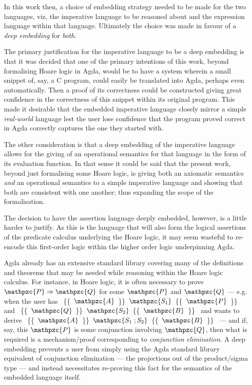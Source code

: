 \documentclass[oneside,12pt]{article}
\newcommand{\textM}[1]{\ensuremath{\mathpzc{#1}}}
\newcommand{\gtcil}[3]{ \!\!\!\!   \{\!\!\{  \!\!\!  \textM{#1} \!\!\! \}\!\!\} \textM{#2}   \{\!\!\{  \!\!\! \textM{#3} \!\!\!  \}\!\!\} \!\!\!  }
\begin{document}
In this work then, a choice of embedding strategy needed to be made for the two languages, viz, the imperative language to be reasoned about and the expression language within that language. Ultimately the choice was made in favour of a \emph{deep embedding} for \emph{both}.

The primary justification for the imperative language to be a deep embedding is that it was decided that one of the primary intentions of this work, beyond formalising Hoare logic in Agda, would be to have a system wherein a small snippet of, say, a C program, could easily be translated into Agda, perhaps even automatically. Then a proof of its correctness could be constructed giving great confidence in the correctness of this snippet within its original program. This made it desirable that the embedded imperative language closely mirror a simple \emph{real-world} language lest the user lose confidence that the program proved correct in Agda correctly captures the one they started with.

The other consideration is that a deep embedding of the imperative language allows for the giving of an operational semantics for that language in the form of its evaluation function. In that sense it could be said that the present work, beyond just formalising some Hoare logic, is giving both an axiomatic semantics \emph{and} an operational semantics to a simple imperative language and showing that both are consistent with one another; thus expanding the scope of the formalisation.


The decision to have the assertion language deeply embedded, however, is a little harder to justify. As this is the language that will also form the logical assertions of the predicate calculus underlying the Hoare logic, it may seem wasteful to re-encode this first-order logic within the higher order logic underpinning Agda.

Agda already has an extensive standard library covering many of the definitions and theorems that may be needed while reasoning within the Hoare logic calculus. For instance, in Hoare logic, it is often necessary to prove $\textM{P} \Rightarrow \textM{Q}$ for some \textM{P} and \textM{Q} --- e.g.\! when the user has \mbox{\gtcil{A}{S_1}{P}} and \mbox{\gtcil{Q}{S_2}{B}} and wants to derive \mbox{\gtcil{A}{S_1 \; ; S_2}{B}} --- and if, say, this \textM{P} is some conjunction involving \textM{Q}, then what is required is a mechanism/proof corresponding to \emph{conjunction elimination}. A deep embedding prevents a user from simply using the Agda standard library equivalent of conjunction elimination --- the projections out of the product/sigma type --- and instead necessitates re-proving this fact for the semantics of the embedded language itself.
\end{document}
